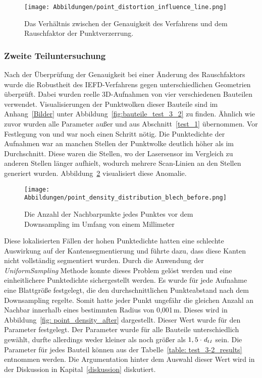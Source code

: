 \begin{figure}[h]
	\texttt{[image: Abbildungen/point\_distortion\_influence\_line.png]}
	\centering
	\caption[Einfluss des Rauschens auf die Genauigkeit]{Das Verhältnis zwischen der Genauigkeit des Verfahrens und dem Rauschfaktor der Punktverzerrung.}
	\label{fig: point_distortion_comparision}
\end{figure}

\subsubsection{Zweite Teiluntersuchung} \label{test_3_part_2}
Nach der Überprüfung der Genauigkeit bei einer Änderung des Rauschfaktors wurde die Robustheit des IEFD-Verfahrens gegen unterschiedlichen Geometrien überprüft. Dabei wurden reelle 3D-Aufnahmen von vier verschiedenen Bauteilen verwendet. Visualisierungen der Punktwolken dieser Bauteile sind im Anhang~\ref{Bilder} unter Abbildung~\ref{fig:bauteile_test_3_2} zu finden. Ähnlich wie zuvor wurden alle Parameter außer \distthresha und \distthreshb aus Abschnitt~\ref{test_1} übernommen. Vor Festlegung von \distthresha und \distthreshb war noch einen Schritt nötig. Die Punktedichte der Aufnahmen war an manchen Stellen der Punktwolke deutlich höher als im Durchschnitt. Diese waren die Stellen, wo der Lasersensor im Vergleich zu anderen Stellen länger aufhielt, wodurch mehrere Scan-Linien an den Stellen generiert wurden. Abbildung~\ref{fig: point_density_before} visualisiert diese Anomalie. 

\begin{figure}[t]
\texttt{[image: Abbildungen/point\_density\_distribution\_blech\_before.png]}
\centering
\caption[Verteilung der Punktedichte vor dem Downsampling]{Die Anzahl der Nachbarpunkte jedes Punktes vor dem Downsampling im Umfang von einem Millimeter}
\label{fig: point_density_before}
\end{figure}

Diese lokalisierten Fällen der hohen Punktedichte hatten eine schlechte Auswirkung auf der Kantensegmentierung und führte dazu, dass diese Kanten nicht vollständig segmentiert wurden. Durch die Anwendung der \textit{UniformSampling} Methode konnte dieses Problem gelöst werden und eine einheitlichere Punktedichte sichergestellt werden. Es wurde für jede Aufnahme eine Blattgröße festgelegt, die den durchschnittlichen Punkteabstand nach dem Downsampling regelte. Somit hatte jeder Punkt ungefähr die gleichen Anzahl an Nachbar innerhalb eines bestimmten Radius von 0,001\,\si{\m}. Dieses wird in Abbildung~\ref{fig: point_density_after} dargestellt. Dieser Wert wurde für den Parameter \distthresha festgelegt. Der Parameter \distthreshb wurde für alle Bauteile unterschiedlich gewählt, durfte allerdings weder kleiner als \distthresha noch größer als $1,5 \cdot \textit{d\textsubscript{t1}}$ sein. Die Parameter für jedes Bauteil können aus der Tabelle~\ref{table: test_3-2_results} entnommen werden. Die Argumentation hinter dem Auswahl dieser Wert wird in der Diskussion in Kapital~\ref{diskussion} diskutiert.

